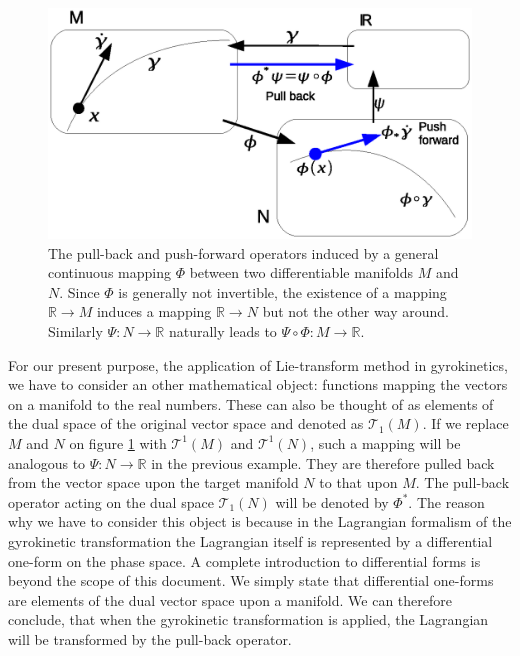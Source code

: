 \documentclass[a4paper,10pt]{article}
\begin{document}
\begin{figure}
 \begin{center}
	\includegraphics[scale=0.6]{pullback-pushforward-mod.eps}
 \end{center}
 \caption{The pull-back and push-forward operators induced by a general continuous mapping $\Phi$ between two differentiable manifolds $M$ and $N$. Since $\Phi$ is generally not invertible, the existence of a mapping $\mathbb{R} \to M$ induces a mapping $\mathbb{R} \to N$ but not the other way around. Similarly $\Psi: N \to \mathbb{R}$ naturally leads to $\Psi \circ \Phi: M \to \mathbb{R}$.}
 \label{fig:pull-back}
\end{figure}

For our present purpose, the application of Lie-transform method in gyrokinetics, we have to consider an other mathematical object: functions mapping the vectors on a manifold to the real numbers. These can also be thought of as elements of the dual space of the original vector space and denoted as $\mathcal{T}_1(M)$. If we replace $M$ and $N$ on figure \ref{fig:pull-back} with $\mathcal{T}^1(M)$ and $\mathcal{T}^1(N)$, such a mapping will be analogous to $\Psi: N \to \mathbb{R}$ in the previous example. They are therefore pulled back from the vector space upon the target manifold $N$ to that upon $M$. The pull-back operator acting on the dual space $\mathcal{T}_1(N)$ will be denoted by $\Phi^*$. The reason why we have to consider this object is because in the Lagrangian formalism of the gyrokinetic transformation the Lagrangian itself is represented by a differential one-form on the phase space. A complete introduction to differential forms is beyond the scope of this document. We simply state that differential one-forms are elements of the dual vector space upon a manifold. We can therefore conclude, that when the gyrokinetic transformation is applied, the Lagrangian will be transformed by the pull-back operator. 
\end{document}
